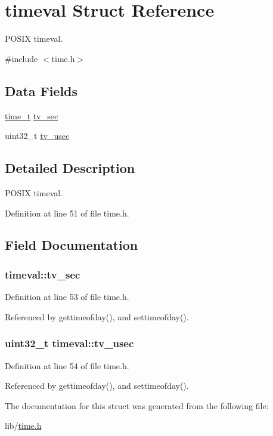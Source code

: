 \hypertarget{structtimeval}{\section{timeval Struct Reference}
\label{structtimeval}
}


P\-O\-S\-I\-X timeval.  




{\ttfamily \#include $<$time.\-h$>$}

\subsection*{Data Fields}
\begin{DoxyCompactItemize}
\item 
\hyperlink{posix_8h_a3346b04b0420b32ccf6b706551b70762}{time\-\_\-t} \hyperlink{structtimeval_aef6ddab1064c430758f9f913b7e4a21e}{tv\-\_\-sec}
\item 
uint32\-\_\-t \hyperlink{structtimeval_a8fd7abf5420981b3ff58bb23df458587}{tv\-\_\-usec}
\end{DoxyCompactItemize}


\subsection{Detailed Description}
P\-O\-S\-I\-X timeval. 

Definition at line 51 of file time.\-h.



\subsection{Field Documentation}
\hypertarget{structtimeval_aef6ddab1064c430758f9f913b7e4a21e}{
\subsubsection[{tv\-\_\-sec}]{ timeval\-::tv\-\_\-sec}}\label{structtimeval_aef6ddab1064c430758f9f913b7e4a21e}


Definition at line 53 of file time.\-h.



Referenced by gettimeofday(), and settimeofday().

\hypertarget{structtimeval_a8fd7abf5420981b3ff58bb23df458587}{
\subsubsection[{tv\-\_\-usec}]{\setlength{\rightskip}{0pt plus 5cm}uint32\-\_\-t timeval\-::tv\-\_\-usec}}\label{structtimeval_a8fd7abf5420981b3ff58bb23df458587}


Definition at line 54 of file time.\-h.



Referenced by gettimeofday(), and settimeofday().



The documentation for this struct was generated from the following file\-:\begin{DoxyCompactItemize}
\item 
lib/\hyperlink{time_8h}{time.\-h}\end{DoxyCompactItemize}
